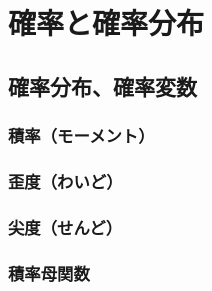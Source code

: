 \chapter{確率と確率分布}
\label{chap:stat-probability}

\begin{chaptergoal}
\end{chaptergoal}

\section{確率分布、確率変数}
\label{sec:stat-moments}


\subsection{積率（モーメント）}

\subsection{歪度（わいど）}

\subsection{尖度（せんど）}

\subsection{積率母関数}

